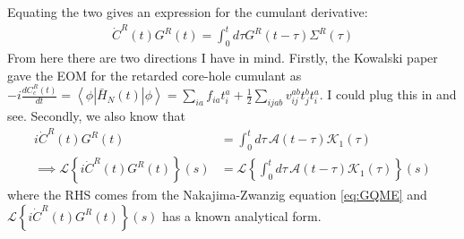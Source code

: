 Equating the two gives an expression for the cumulant derivative:
\begin{align}
\dot{C}^R(t)G^R(t) = \int_0^t d \tau G^R(t-\tau) \Sigma^R(\tau)
\end{align}
From here there are two directions I have in mind. Firstly, the Kowalski paper gave the EOM for the retarded core-hole cumulant as $-i\frac{d C_c^R(t)}{dt} = \left< \phi \left| \bar{H}_N(t) \right| \phi \right> = \sum_{ia} f_{ia} t_i^a + \frac{1}{2} \sum_{ijab} v_{ij}^{ab} t_j^b t_i^a$. I could plug this in and see. Secondly, we also know that 
\begin{align}
i \dot{C}^R(t) G^R(t) &= \int_{0}^{t} d \tau\, \mathcal{A}(t - \tau) \mathcal{K}_1(\tau)  \\  
\implies \mathcal{L}\left\{i \dot{C}^R(t) G^R(t)\right\}(s) &= \mathcal{L}\left\{\int_{0}^{t} d \tau\, \mathcal{A}(t - \tau) \mathcal{K}_1(\tau)\right\}(s)
\end{align}
where the RHS comes from the Nakajima-Zwanzig equation \eqref{eq:GQME} and $\mathcal{L}\left\{i \dot{C}^R(t) G^R(t)\right\}(s) $ has a known analytical form.
